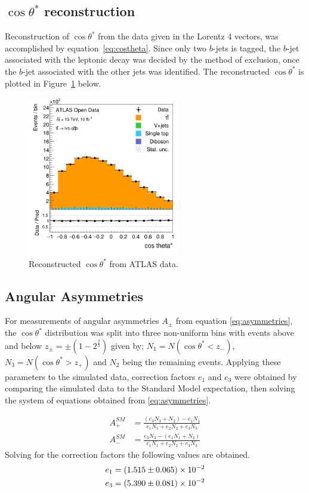 \documentclass[12pt,a4paper]{article}
\numberwithin{equation}{section}
\begin{document}
\subsection{$\cos \theta^{*}$ reconstruction}
Reconstruction of $\cos \theta^{*}$ from the data given in the Lorentz 4 vectors, was
accomplished by equation~\eqref{eq:costheta}. Since only two $b$-jets is tagged,
the $b$-jet associated with the leptonic decay was decided by the method of
exclusion, once the $b$-jet associated with the other jets was identified. The
reconstructed $\cos \theta^{*}$ is plotted in Figure~\ref{fig:costhetaatlas} below.
\begin{figure}[H]
  \centering
  \includegraphics[width=0.6\textwidth]{figures/hist_costheta}
  \caption{\label{fig:costhetaatlas}Reconstructed $\cos \theta^{*}$ from ATLAS data.}
\end{figure}

\subsection{Angular Asymmetries}
For measurements of angular asymmetries $A_{\pm}$ from equation
\eqref{eq:asymmetries}, the $\cos\theta^{*}$ distribution was split into three
non-uniform bins with events above and below $z_{\pm} = \pm(1-2^{\frac{2}{3}})$
given by; $N_1 = N(\cos \theta^{*}<z_-)$, $N_3 = N(\cos \theta^{*}>z_+)$ and $N_2$ being
the remaining events. Applying these parameters to the simulated data,
correction factors $e_1$ and $e_3$ were obtained by comparing the simulated data
to the Standard Model expectation, then solving the system of equations obtained
from \eqref{eq:asymmetries}.

\begin{align}
	A_{+}^{SM} &= \frac{(e_3N_3 + N_2) - e_1N_1}{e_1N_1 + e_2N_2 + e_3N_3} \\
	A_{-}^{SM} &= \frac{e_3N_3 - (e_1N_1 + N_2)}{e_1N_1 + e_2N_2 + e_3N_3}
\end{align}
Solving for the correction factors the following values are obtained.
\begin{align}
	e_1 &=  \num{1.515 +- 0.065E-2} \\ e_3 &= \num{5.390 +- 0.081E-2}
\end{align}
\end{document}
